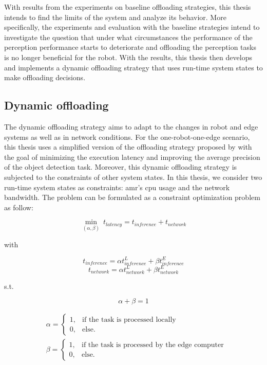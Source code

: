 With results from the experiments on baseline offloading strategies, this thesis intends to find the limits of the system and analyze its behavior. More specifically, the experiments and evaluation with the baseline strategies intend to investigate the question that under what circumstances the performance of the perception performance starts to deteriorate and offloading the perception tasks is no longer beneficial for the robot. With the results, this thesis then develops and implements a dynamic offloading strategy that uses run-time system states to make offloading decisions. 

\subsection{Dynamic offloading}

The dynamic offloading strategy aims to adapt to the changes in robot and edge systems as well as in network conditions.  For the one-robot-one-edge scenario, this thesis uses a simplified version of the offloading strategy proposed by \citeauthor*{Ning2019} \cite{Ning2019} with the goal of minimizing the execution latency and improving the average precision of the object detection task. Moreover, this dynamic offloading strategy is subjected to the constraints of other system states. In this thesis, we consider two run-time system states as constraints: \gls{amr}'s \gls{cpu} usage and the network bandwidth. The problem can be formulated as a constraint optimization problem as follow:

\begin{equation}
    \min_{(\alpha, \beta)} \: t_{latency} = t_{inference} + t_{network}
\end{equation}

with

\begin{equation*}
    t_{inference} = \alpha t_{inference}^{L} + \beta t_{inference}^{E}
\end{equation*}
\begin{equation*}
    t_{network} = \alpha t_{network}^{L} + \beta t_{network}^{E}
\end{equation*}

s.t.

\begin{equation*}
    \alpha + \beta = 1
\end{equation*}

\begin{align*}
    & \alpha = \begin{cases}
        1, & \text{if the task is processed locally} \\
        0, & \text{else.}
    \end{cases} \\
    & \beta = \begin{cases}
        1, & \text{if the task is processed by the edge computer} \\
        0, & \text{else.}
    \end{cases}
\end{align*}

